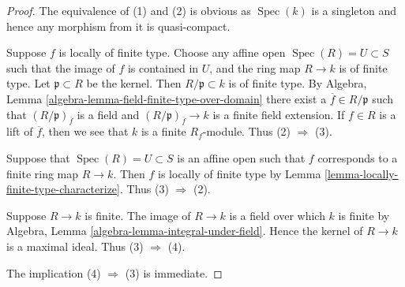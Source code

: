 \documentclass[10pt,a4paper]{amsart}
\theoremstyle{plain}
\theoremstyle{definition}
\theoremstyle{remark}
\numberwithin{equation}{subsection}
\def\Spec{\mathop{\mathrm{Spec}}}
\begin{document}
\begin{proof}
The equivalence of (1) and (2) is obvious as $\Spec(k)$
is a singleton and hence any morphism from it is quasi-compact.

\medskip\noindent
Suppose $f$ is locally of finite type. Choose any affine open
$\Spec(R) = U \subset S$ such that the image of $f$
is contained in $U$, and the ring map $R \to k$
is of finite type. Let $\mathfrak p \subset R$ be the kernel.
Then $R/\mathfrak p \subset k$ is of finite type. By
Algebra, Lemma \ref{algebra-lemma-field-finite-type-over-domain}
there exist a $\overline{f} \in R/\mathfrak p$ such that
$(R/\mathfrak p)_{\overline{f}}$ is a field and
$(R/\mathfrak p)_{\overline{f}} \to k$ is a finite field
extension. If $f \in R$ is a lift of $\overline{f}$, then
we see that $k$ is a finite $R_f$-module. Thus (2) $\Rightarrow$ (3).

\medskip\noindent
Suppose that $\Spec(R) = U \subset S$ is an affine open
such that $f$ corresponds to a finite ring map $R \to k$.
Then $f$ is locally of finite type
by Lemma \ref{lemma-locally-finite-type-characterize}.
Thus (3) $\Rightarrow$ (2).

\medskip\noindent
Suppose $R \to k$ is finite. The image of $R \to k$ is a field
over which $k$ is finite by
Algebra, Lemma \ref{algebra-lemma-integral-under-field}.
Hence the kernel of $R \to k$ is a maximal ideal.
Thus (3) $\Rightarrow$ (4).

\medskip\noindent
The implication (4) $\Rightarrow$ (3) is immediate.
\end{proof}
\end{document}
